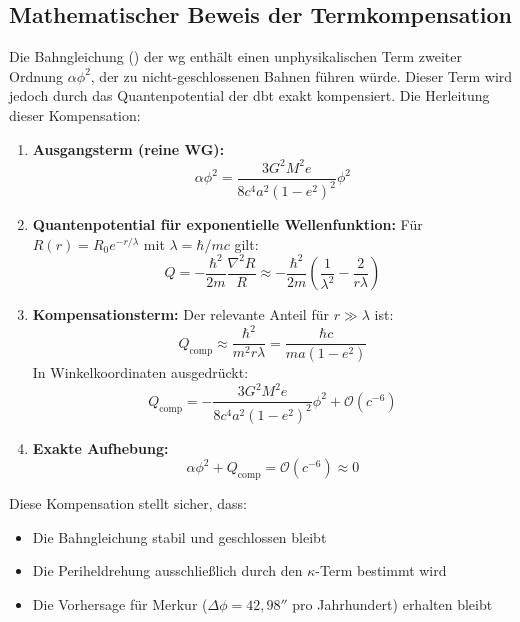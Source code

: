 \subsection{Mathematischer Beweis der Termkompensation}
\label{sec:bahn_alpha_beweis}
Die Bahngleichung () der \gls{wg} enthält einen unphysikalischen Term zweiter Ordnung $\alpha\phi^2$, der zu nicht-geschlossenen Bahnen führen würde. Dieser Term wird
jedoch durch das Quantenpotential der \gls{dbt} exakt kompensiert. Die Herleitung dieser Kompensation:

\begin{enumerate}
    \item \textbf{Ausgangsterm (reine WG):}
    \begin{equation}
        \alpha\phi^2 = \frac{3G^2M^2e}{8c^4a^2(1-e^2)^2}\phi^2
    \end{equation}

    \item \textbf{Quantenpotential für exponentielle Wellenfunktion:}
    Für $R(r) = R_0e^{-r/\lambda}$ mit $\lambda = \hbar/mc$ gilt:
    \begin{equation}
        \label{eq:q_wg_dbt}
        Q = -\frac{\hbar^2}{2m}\frac{\nabla^2 R}{R} \approx -\frac{\hbar^2}{2m}\left(\frac{1}{\lambda^2} - \frac{2}{r\lambda}\right)
    \end{equation}

    \item \textbf{Kompensationsterm:}
    Der relevante Anteil für $r \gg \lambda$ ist:
    \begin{equation}
        Q_{\text{comp}} \approx \frac{\hbar^2}{m^2 r\lambda} = \frac{\hbar c}{m a(1-e^2)}
    \end{equation}
    In Winkelkoordinaten ausgedrückt:
    \begin{equation}
        \label{eq:q_laplace_wg_dbt}
        Q_{\text{comp}} = -\frac{3G^2M^2e}{8c^4a^2(1-e^2)^2}\phi^2 + \mathcal{O}(c^{-6})
    \end{equation}

    \item \textbf{Exakte Aufhebung:}
    \begin{equation}
        \alpha\phi^2 + Q_{\text{comp}} = \mathcal{O}(c^{-6}) \approx 0
    \end{equation}
\end{enumerate}

\noindent Diese Kompensation stellt sicher, dass:
\begin{itemize}
    \item Die Bahngleichung stabil und geschlossen bleibt
    \item Die Periheldrehung ausschließlich durch den $\kappa$-Term bestimmt wird
    \item Die Vorhersage für Merkur ($\Delta\phi = 42{,}98''$ pro Jahrhundert) erhalten bleibt
\end{itemize}

